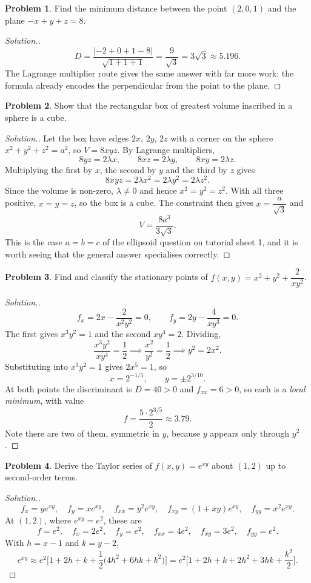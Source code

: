 \documentclass[11pt,a4paper]{article}
\theoremstyle{definition}
\newtheorem{problemx}{Problem}[subsection]
\newenvironment{problem}{\begin{problemx}}{\end{problemx}}
\newenvironment{solution}
  {\renewcommand{\qedsymbol}{}\begin{proof}[\textit{Solution}.]}
  {\end{proof}}
\begin{document}
\begin{problem}
Find the minimum distance between the point $(2,0,1)$ and the plane
$-x+y+z = 8$.
\end{problem}
\begin{solution}
$$D = \frac{\left|-2+0+1-8\right|}{\sqrt{1+1+1}}
= \frac{9}{\sqrt3} = 3\sqrt3 \approx 5.196 .$$
The Lagrange multiplier route gives the same answer with far more work; the
formula already encodes the perpendicular from the point to the plane.
\end{solution}

\begin{problem}
Show that the rectangular box of greatest volume inscribed in a sphere is a
cube.
\end{problem}
\begin{solution}
Let the box have edges $2x$, $2y$, $2z$ with a corner on the sphere
$x^2+y^2+z^2 = a^2$, so $V = 8xyz$. By Lagrange multipliers,
$$8yz = 2\lambda x,\qquad 8xz = 2\lambda y,\qquad 8xy = 2\lambda z .$$
Multiplying the first by $x$, the second by $y$ and the third by $z$ gives
$$8xyz = 2\lambda x^2 = 2\lambda y^2 = 2\lambda z^2 .$$
Since the volume is non-zero, $\lambda\neq 0$ and hence $x^2 = y^2 = z^2$. With
all three positive, $x = y = z$, so the box is a cube. The constraint then gives
$x = \dfrac{a}{\sqrt3}$ and
$$V = \frac{8a^3}{3\sqrt3}.$$
This is the case $a=b=c$ of the ellipsoid question on tutorial sheet 1, and it
is worth seeing that the general answer specialises correctly.
\end{solution}

\begin{problem}
Find and classify the stationary points of
$f(x,y) = x^2+y^2+\dfrac{2}{xy^2}$.
\end{problem}
\begin{solution}
$$f_x = 2x - \frac{2}{x^2y^2} = 0,\qquad f_y = 2y - \frac{4}{xy^3} = 0 .$$
The first gives $x^3y^2 = 1$ and the second $xy^4 = 2$. Dividing,
$$\frac{x^3y^2}{xy^4} = \frac12 \implies \frac{x^2}{y^2} = \frac12
\implies y^2 = 2x^2 .$$
Substituting into $x^3y^2 = 1$ gives $2x^5 = 1$, so
$$x = 2^{-1/5},\qquad y = \pm 2^{3/10}.$$
At both points the discriminant is $D = 40 > 0$ and $f_{xx} = 6 > 0$, so each is
a \emph{local minimum}, with value
$$f = \frac{5\cdot 2^{3/5}}{2}\approx 3.79 .$$
Note there are two of them, symmetric in $y$, because $y$ appears only through
$y^2$.
\end{solution}

\begin{problem}
Derive the Taylor series of $f(x,y) = e^{xy}$ about $(1,2)$ up to second-order
terms.
\end{problem}
\begin{solution}
$$f_x = ye^{xy},\quad f_y = xe^{xy},\quad
f_{xx} = y^2e^{xy},\quad f_{xy} = (1+xy)e^{xy},\quad f_{yy} = x^2e^{xy}.$$
At $(1,2)$, where $e^{xy} = e^2$, these are
$$f = e^2,\quad f_x = 2e^2,\quad f_y = e^2,\quad
f_{xx} = 4e^2,\quad f_{xy} = 3e^2,\quad f_{yy} = e^2 .$$
With $h = x-1$ and $k = y-2$,
$$e^{xy} \approx e^2\Big[1 + 2h + k + \frac12\big(4h^2 + 6hk + k^2\big)\Big]
= e^2\Big[1 + 2h + k + 2h^2 + 3hk + \frac{k^2}{2}\Big].$$
\end{solution}
\end{document}
